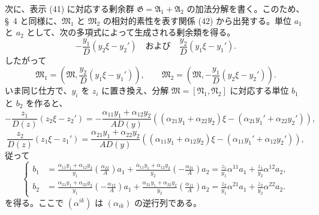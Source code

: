 \documentclass[11pt]{article}
\begin{document}
次に、表示 (41) に対応する剰余群 $\mathfrak G=\mathfrak A_1+\mathfrak A_2$ の加法分解を書く。このため、\S~4 と同様に、$\mathfrak M_1$ と $\mathfrak M_2$ の相対的素性を表す関係 (42) から出発する。単位 $a_1$ と $a_2$ として、次の多項式によって生成される剰余類を得る。
\[
 -\frac{y_1}{D}(y_2\xi-y_2')
 \quad\text{および}\quad
 \frac{y_2}{D}(y_1\xi-y_1').
\]
したがって
\[
 \mathfrak M_1=\left(\mathfrak M,\frac{y_2}{D}(y_1\xi-y_1')\right),
 \qquad
 \mathfrak M_2=\left(\mathfrak M,-\frac{y_1}{D}(y_2\xi-y_2')\right).
\]
いま同じ仕方で、$y_i$ を $z_i$ に置き換え、分解 $\mathfrak M=[\mathfrak N_1,\mathfrak N_2]$ に対応する単位 $b_1$ と $b_2$ を作ると、
\[
 -\frac{z_1}{D(z)}(z_2\xi-z_2')
 =-\frac{\alpha_{11}y_1+\alpha_{12}y_2}{AD(y)}
 ((\alpha_{21}y_1+\alpha_{22}y_2)\xi-(\alpha_{21}y_1'+\alpha_{22}y_2')),
\]
\[
 \frac{z_2}{D(z)}(z_1\xi-z_1')
 =\frac{\alpha_{21}y_1+\alpha_{22}y_2}{AD(y)}
 ((\alpha_{11}y_1+\alpha_{12}y_2)\xi-(\alpha_{11}y_1'+\alpha_{12}y_2')),
\]
従って
\begin{equation}
\left\{
\begin{aligned}
 b_1&=\frac{\alpha_{11}y_1+\alpha_{12}y_2}{y_1}
 \left(\frac{\alpha_{22}}{A}\right)a_1
 +\frac{\alpha_{11}y_1+\alpha_{12}y_2}{y_2}
 \left(-\frac{\alpha_{21}}{A}\right)a_2
 =\frac{z_1}{y_1}\alpha^{11}a_1+\frac{z_1}{y_2}\alpha^{12}a_2,\\
 b_2&=\frac{\alpha_{21}y_1+\alpha_{22}y_2}{y_1}
 \left(-\frac{\alpha_{12}}{A}\right)a_1
 +\frac{\alpha_{21}y_1+\alpha_{22}y_2}{y_2}
 \left(\frac{\alpha_{11}}{A}\right)a_2
 =\frac{z_2}{y_1}\alpha^{21}a_1+\frac{z_2}{y_2}\alpha^{22}a_2.
\end{aligned}\right.
\tag{43}
\end{equation}
を得る。ここで $(\alpha^{ik})$ は $(\alpha_{ik})$ の逆行列である。
\end{document}
